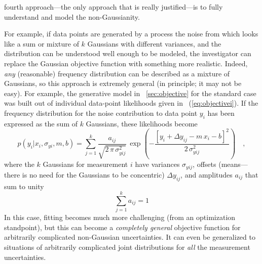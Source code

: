\documentclass[12pt,twoside,pdftex]{article}
\begin{document}
fourth approach---the only approach that is really justified---is to
fully understand and model the non-Gaussianity.

For example, if data points are generated by a process the noise from
which looks like a sum or mixture of $k$ Gaussians with different
variances, and the distribution can be understood well enough to be
modeled, the investigator can replace the Gaussian objective function
with something more realistic.  Indeed, \emph{any} (reasonable)
frequency distribution can be described as a mixture of Gaussians, so
this approach is extremely general (in principle; it may not be easy).
For example, the generative model in \sectionname~\ref{sec:objective}
for the standard case was built out of individual data-point
likelihoods given in \equationname~(\ref{eq:objectivei}).  If the
frequency distribution for the noise contribution to data point $y_i$
has been expressed as the sum of $k$ Gaussians, these likelihoods
become
\begin{equation}
p(y_i|x_i,\sigma_{yi},m,b) = \sum_{j=1}^k
 \frac{a_{ij}}{\sqrt{2\,\pi\,\sigma_{yij}^2}}
 \,\exp\left(-\frac{[y_i+\Delta y_{ij}-m\,x_i-b]^2}{2\,\sigma_{yij}^2}\right)
 \quad ,
\end{equation}
where the $k$ Gaussians for measurement $i$ have variances
$\sigma_{yij}$, offsets (means---there is no need for the Gaussians to
be concentric) $\Delta y_{ij}$, and amplitudes $a_{ij}$ that sum to
unity
\begin{equation}
\sum_{j=1}^k a_{ij} = 1
\end{equation}
In this case, fitting becomes much more challenging (from an
optimization standpoint), but this can become a \emph{completely
  general} objective function for arbitrarily complicated non-Gaussian
uncertainties.  It can even be generalized to situations of
arbitrarily complicated joint distributions for \emph{all} the
measurement uncertainties.
\end{document}
